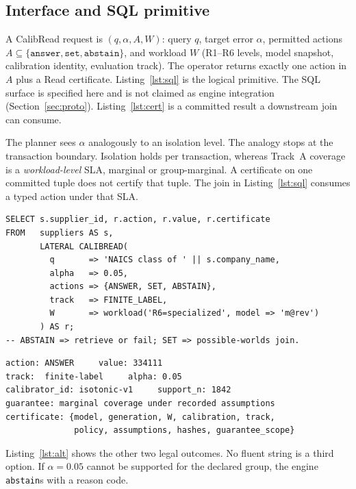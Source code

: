 \documentclass[sigconf, nonacm]{acmart}
\begin{document}
\subsection{Interface and SQL primitive}

A CalibRead request is $(q, \alpha, A, W)$: query $q$, target error $\alpha$, permitted actions $A \subseteq \{\texttt{answer},\texttt{set},\texttt{abstain}\}$, and workload $W$ (R1--R6 levels, model snapshot, calibration identity, evaluation track). The operator returns exactly one action in $A$ plus a Read certificate. Listing~\ref{lst:sql} is the logical primitive. The SQL surface is specified here and is not claimed as engine integration (Section~\ref{sec:proto}). Listing~\ref{lst:cert} is a committed result a downstream join can consume.

The planner sees $\alpha$ analogously to an isolation level. The analogy stops at the transaction boundary. Isolation holds per transaction, whereas Track~A coverage is a \emph{workload-level} SLA, marginal or group-marginal. A certificate on one committed tuple does not certify that tuple. The join in Listing~\ref{lst:sql} consumes a typed action under that SLA.

\begin{lstlisting}[caption={Parametric Read as a logical SQL operator. $\alpha$ is a workload SLA, not a per-tuple posterior.},label={lst:sql}]
SELECT s.supplier_id, r.action, r.value, r.certificate
FROM   suppliers AS s,
       LATERAL CALIBREAD(
         q       => 'NAICS class of ' || s.company_name,
         alpha   => 0.05,
         actions => {ANSWER, SET, ABSTAIN},
         track   => FINITE_LABEL,
         W       => workload('R6=specialized', model => 'm@rev')
       ) AS r;
-- ABSTAIN => retrieve or fail; SET => possible-worlds join.
\end{lstlisting}

\begin{lstlisting}[caption={Returned Read object (Track A singleton). Field values are illustrative catalog metadata. The certificate is why-provenance for the parametric value.},label={lst:cert}]
action: ANSWER     value: 334111
track:  finite-label     alpha: 0.05
calibrator_id: isotonic-v1     support_n: 1842
guarantee: marginal coverage under recorded assumptions
certificate: {model, generation, W, calibration, track,
              policy, assumptions, hashes, guarantee_scope}
\end{lstlisting}

Listing~\ref{lst:alt} shows the other two legal outcomes. No fluent string is a third option. If $\alpha{=}0.05$ cannot be supported for the declared group, the engine \texttt{abstain}s with a reason code.
\end{document}
